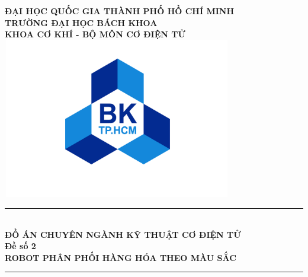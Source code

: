 \begin{titlepage}   
    \begin{center}
        \vspace*{-2cm} 
        \large
        \textbf{ĐẠI HỌC QUỐC GIA THÀNH PHỐ HỒ CHÍ MINH \\
        TRƯỜNG ĐẠI HỌC BÁCH KHOA\\
        KHOA CƠ KHÍ - BỘ MÔN CƠ ĐIỆN TỬ\\}
        \vspace{0.5cm}
        \includegraphics[width=100mm, height=70mm]{pictures/hcmut.png} \\
        \rule{\linewidth}{0.5mm}\\
        \vspace{1cm}
        \large
        \textbf{ĐỒ ÁN CHUYÊN NGÀNH KỸ THUẬT CƠ ĐIỆN TỬ}\\                                                                                                                                                                                                                    
        \vspace*{0.5cm}
        \textbf{Đề số 2}\\                                                                                                                                                                                                                                                                                                                                                                                                                                             
        \vspace{0.25cm}
        \textbf{ROBOT PHÂN PHỐI HÀNG HÓA THEO MÀU SẮC}\\
        \vspace{0.5cm}
        \rule{\linewidth}{0.5mm}\\

\end{center}
\end{titlepage}
